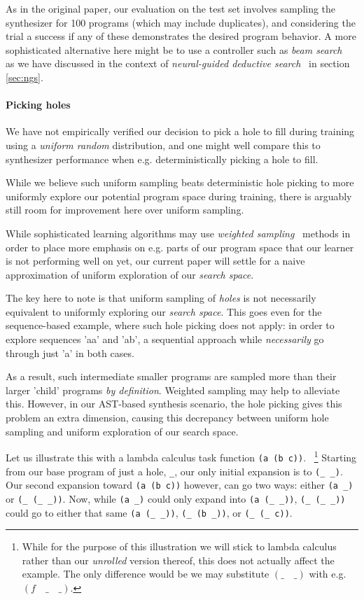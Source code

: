 \documentclass{article}
\begin{document}
As in the original paper,
our evaluation on the test set involves sampling the synthesizer for 100 programs (which may include duplicates),
and considering the trial a success if any of these demonstrates the desired program behavior.
A more sophisticated alternative here might be to use a controller such as \emph{beam search}~\citep{polosukhin2018neural}
as we have discussed in the context of \emph{neural-guided deductive search}~\citep{deepcoder} in section \ref{sec:ngs}.

\paragraph{Picking holes} \label{sec:picking}

We have not empirically verified our decision to pick a hole to fill during training using a \emph{uniform random} distribution,
and one might well compare this to synthesizer performance when e.g. deterministically picking a hole to fill.

While we believe such uniform sampling beats deterministic hole picking to more uniformly explore our potential program space during training,
there is arguably still room for improvement here over uniform sampling.

While sophisticated learning algorithms may use \emph{weighted sampling}~\citep{chen1994weighted}
methods in order to place more emphasis on e.g. parts of our program space that our learner is not performing well on yet,
our current paper will settle for a naive approximation of uniform exploration of our \emph{search space}.

The key here to note is that uniform sampling of \emph{holes} is not necessarily equivalent to uniformly exploring our \emph{search space}.
This goes even for the sequence-based example, where such hole picking does not apply:
in order to explore sequences 'aa' and 'ab',
a sequential approach while \emph{necessarily} go through just 'a' in both cases.

As a result, such intermediate smaller programs are sampled more than their larger 'child' programs \emph{by definition}.
Weighted sampling may help to alleviate this.
However, in our AST-based synthesis scenario,
the hole picking gives this problem an extra dimension,
causing this decrepancy between uniform hole sampling and uniform exploration of our search space.

Let us illustrate this with a lambda calculus task function \verb|(a (b c))|.%
~\footnote{
    While for the purpose of this illustration we will stick to lambda calculus
    rather than our \emph{unrolled} version thereof,
    this does not actually affect the example.
    The only difference would be we may substitute $(\_\quad\_)$ with e.g. $(f\quad\_\quad\_)$.
}
Starting from our base program of just a hole, \verb|_|,
our only initial expansion is to \verb|(_ _)|.
Our second expansion toward \verb|(a (b c))| however,
can go two ways: either \verb|(a _)| or \verb|(_ (_ _))|.
Now, while \verb|(a _)| could only expand into \verb|(a (_ _))|,
\verb|(_ (_ _))| could go to either that same \verb|(a (_ _))|,
\verb|(_ (b _))|, or \verb|(_ (_ c))|.
\end{document}
